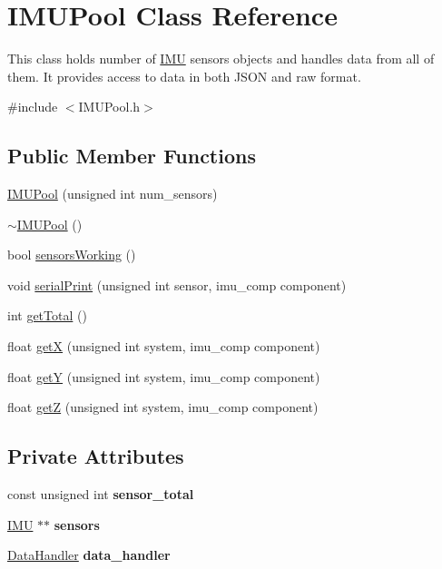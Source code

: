 \hypertarget{class_i_m_u_pool}{}\section{I\+M\+U\+Pool Class Reference}
\label{class_i_m_u_pool}


This class holds number of \hyperlink{class_i_m_u}{I\+MU} sensors\textquotesingle{} objects and handles data from all of them. It provides access to data in both J\+S\+ON and raw format.  




{\ttfamily \#include $<$I\+M\+U\+Pool.\+h$>$}

\subsection*{Public Member Functions}
\begin{DoxyCompactItemize}
\item 
\hyperlink{class_i_m_u_pool_ab3160066458f0c69b54b6f2fce31b0e5}{I\+M\+U\+Pool} (unsigned int num\+\_\+sensors)
\item 
\hyperlink{class_i_m_u_pool_ab7e6235773fc29b6f10a61ef8822fff3}{$\sim$\+I\+M\+U\+Pool} ()
\item 
bool \hyperlink{class_i_m_u_pool_a29487e0bed851336ec1b7682bdb3a8d2}{sensors\+Working} ()
\item 
void \hyperlink{class_i_m_u_pool_ae656ae411b188d1484c524dd42c6cbfa}{serial\+Print} (unsigned int sensor, imu\+\_\+comp component)
\item 
int \hyperlink{class_i_m_u_pool_a586d1f4afaea96029a546fd4154db362}{get\+Total} ()
\item 
float \hyperlink{class_i_m_u_pool_a36030cdecae6c63053565949615420f6}{getX} (unsigned int system, imu\+\_\+comp component)
\item 
float \hyperlink{class_i_m_u_pool_a8822803453deb8b844db19fec6aaad13}{getY} (unsigned int system, imu\+\_\+comp component)
\item 
float \hyperlink{class_i_m_u_pool_a2e0f9ce0c95bbe4d9bd11c4fa06987b2}{getZ} (unsigned int system, imu\+\_\+comp component)
\end{DoxyCompactItemize}
\subsection*{Private Attributes}
\begin{DoxyCompactItemize}
\item 
\mbox{\label{class_i_m_u_pool_a7e505fdd34d40659a0c27e39355dd614}} 
const unsigned int {\bfseries sensor\+\_\+total}
\item 
\mbox{\label{class_i_m_u_pool_aced7f83e4fe5cfd8bbfe97d3565f9c2c}} 
\hyperlink{class_i_m_u}{I\+MU} $\ast$$\ast$ {\bfseries sensors}
\item 
\mbox{\label{class_i_m_u_pool_a498fa27acbd1d4d60c9a21010c017b12}} 
\hyperlink{class_data_handler}{Data\+Handler} {\bfseries data\+\_\+handler}
\end{DoxyCompactItemize}


